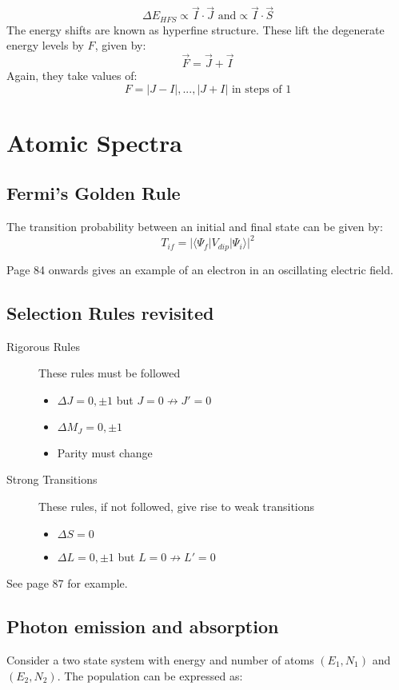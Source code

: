 \documentclass[12pt]{article}
\begin{document}
\[\Delta E_{HFS} \propto \vec{I} \cdot \vec{J} \text{ and} \propto \vec{I} \cdot \vec{S}\]
The energy shifts are known as hyperfine structure. These lift the degenerate energy levels by $F$, given by:
\[\vec{F} = \vec{J} + \vec{I}\]
Again, they take values of:
\[F = |J-I|,...,|J+I| \text{ in steps of 1}\]

\section{Atomic Spectra}

\subsection{Fermi's Golden Rule}
The transition probability between an initial and final state can be given by:
\[T_{if} = |\langle \Psi_f | V_{dip}|\Psi_i\rangle|^2\]

Page 84 onwards gives an example of an electron in an oscillating electric field. 

\subsection{Selection Rules revisited}
\begin{description}
    \item [Rigorous Rules] These rules must be followed
    \begin{itemize}
        \item $\Delta J = 0, \pm 1$ but $J=0 \not\to J' = 0$
        \item $\Delta M_J=0,\pm1$
        \item Parity must change
    \end{itemize}
    \item [Strong Transitions] These rules, if not followed, give rise to weak transitions
    \begin{itemize}
        \item  $\Delta S = 0$
        \item $\Delta L = 0, \pm 1$ but $L=0 \not \to L' = 0$
    \end{itemize}
\end{description}
See page 87 for example. 

\subsection{Photon emission and absorption}
Consider a two state system with energy and number of atoms $(E_1,N_1)$ and $(E_2,N_2)$. The population can be expressed as:
\end{document}
